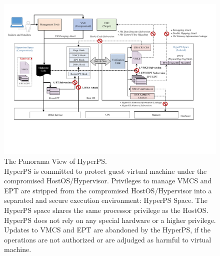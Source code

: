 \begin{figure}
    \centering
    \includegraphics[width=1\textwidth]{IMG/panorama.pdf}
    \caption{The Panorama View of HyperPS. \\ HyperPS is committed to protect guest virtual machine under the compromised HostOS/Hypervisor. Privileges to manage VMCS and EPT are stripped from the compromised HostOS/Hypervisor into a separated and secure execution environment: HyperPS Space. The HyperPS space shares the same processor privilege as the HostOS. HyperPS does not rely on any special hardware or a higher privilege. Updates to VMCS and EPT are abandoned by the HyperPS, if the operations are not authorized or are adjudged as harmful to virtual machine.}
    \label{pic:panorama}
\end{figure}

